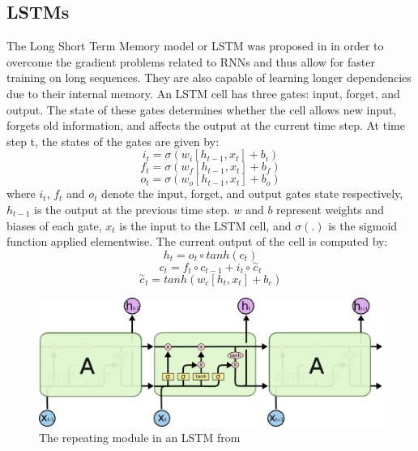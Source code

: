 \subsection{LSTMs}

The Long Short Term Memory model or LSTM was proposed in \cite{LSTMs} in order to overcome the gradient problems related to RNNs and thus allow for faster training on long sequences.
They are also capable of learning longer dependencies due to their internal memory. An LSTM cell has three gates: input, forget, and output.
The state of these gates determines whether the cell allows new input, forgets old information, and affects the output at the current time step.
At time step t, the states of the gates are given by:
\begin{equation}
    i_t=\sigma(w_i[h_{t-1},x_t]+b_i)
\end{equation}
\begin{equation}
    f_t=\sigma(w_f[h_{t-1},x_t]+b_f)
\end{equation}
\begin{equation}
    o_t=\sigma(w_o[h_{t-1},x_t]+b_o)
\end{equation}
where $i_t$, $f_t$ and $o_t$ denote the input, forget, and output gates state respectively, $h_{t-1}$ is the output at the previous time step.
$w$ and $b$ represent weights and biases of each gate, $x_t$ is the input to the LSTM cell, and $\sigma (.)$ is the sigmoid function applied elementwise.
The current output of the cell is computed by:
\begin{equation}
    h_t=o_t \circ tanh(c_t)
\end{equation}
\begin{equation}
    c_t = f_t \circ c_{t-1}+i_t \circ \overset{\sim}{c}_t
\end{equation}
\begin{equation}
    \overset{\sim}{c}_t = tanh(w_c[h_t,x_t]+b_c)
\end{equation}

\begin{figure}
    \centering
    \includegraphics[width=0.8\columnwidth]{Figures/LSTM}
    \decoRule
    \caption{The repeating module in an LSTM from \cite{oinkina}}
    \label{fig:LSTM}
\end{figure}

